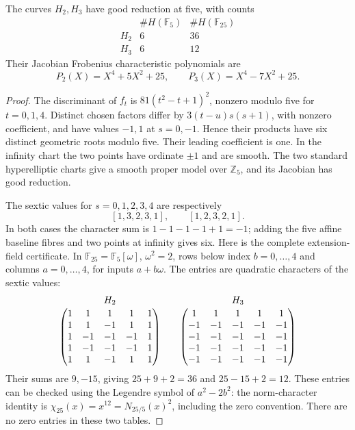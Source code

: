 \begin{theorem}\label{qs-five}
The curves \(H_2,H_3\) have good reduction at five, with counts
\[
\begin{array}{c|rr}
 &\#H(\mathbb F_5)&\#H(\mathbb F_{25})\\\hline
 H_2&6&36\\ H_3&6&12
\end{array}
\]
Their Jacobian Frobenius characteristic polynomials are
\begin{equation}\label{qs-five-polynomials}
 P_2(X)=X^4+5X^2+25,\qquad P_3(X)=X^4-7X^2+25.
\end{equation}
\end{theorem}
\begin{proof}
The discriminant of \(f_t\) is \(81(t^2-t+1)^2\), nonzero modulo
five for \(t=0,1,4\). Distinct chosen factors differ by
\(3(t-u)s(s+1)\), with nonzero coefficient, and have values \(-1,1\)
at \(s=0,-1\). Hence their products have six distinct geometric roots
modulo five. Their leading coefficient is one. In the infinity chart
the two points have ordinate \(\pm1\) and are smooth. The two standard
hyperelliptic charts give a smooth proper model over \(\mathbb Z_5\),
and its Jacobian has good reduction.

The sextic values for \(s=0,1,2,3,4\) are respectively
\[
 [1,3,2,3,1],\qquad[1,2,3,2,1].
\]
In both cases the character sum is \(1-1-1-1+1=-1\); adding the
five affine baseline fibres and two points at infinity gives six.
Here is the complete extension-field certificate. In
\(\mathbb F_{25}=\mathbb F_5[\omega]\), \(\omega^2=2\), rows below
index \(b=0,\ldots,4\) and columns \(a=0,\ldots,4\), for inputs
\(a+b\omega\). The entries are quadratic characters of the sextic values:
\[
\begin{array}{c@{\qquad}c}
 H_2&H_3\\[2pt]
 \begin{pmatrix}
 1&1&1&1&1\\1&1&-1&1&1\\1&-1&-1&-1&1\\
 1&-1&-1&-1&1\\1&1&-1&1&1
 \end{pmatrix}
 &
 \begin{pmatrix}
 1&1&1&1&1\\-1&-1&-1&-1&-1\\-1&-1&-1&-1&-1\\
 -1&-1&-1&-1&-1\\-1&-1&-1&-1&-1
 \end{pmatrix}
\end{array}
\]
Their sums are \(9,-15\), giving \(25+9+2=36\) and
\(25-15+2=12\). These entries can be checked using the Legendre
symbol of \(a^2-2b^2\): the norm-character identity is
\(\chi_{25}(x)=x^{12}=N_{25/5}(x)^2\), including the zero convention.
There are no zero entries in these two tables.


\end{proof}
